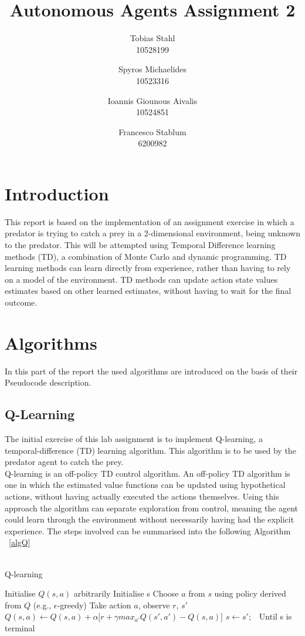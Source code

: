 \documentclass[11pt]{article}
\title{
	\textbf{Autonomous Agents Assignment 2}
}
\author{Tobias Stahl \\ 10528199 \and Spyros Michaelides \\ 10523316 \and Ioannis Giounous Aivalis \\ 10524851 \and Francesco Stablum \\ 6200982}
\begin{document}
\maketitle


\section{Introduction}
This report is based on the implementation of an assignment exercise in which a predator is trying to catch a prey in a 2-dimensional environment, being unknown to the predator. This will be attempted  using Temporal Difference learning methods (TD), a combination of Monte Carlo and dynamic programming. TD learning methods can learn directly from experience, rather than having to rely on a model of the environment. TD methods can update action state values estimates based on other learned estimates, without having to wait for the final outcome. 

\section{Algorithms}
In this part of the report the used algorithms are introduced on the basis of their Pseudocode description.


\subsection{Q-Learning}
The initial exercise of this lab assignment is to implement Q-learning, a temporal-difference (TD) learning algorithm. This algorithm is to be used by the predator agent to catch the prey.\\
Q-learning is an off-policy TD control algorithm. An off-policy TD algorithm is one in which the estimated value functions can be updated using hypothetical actions, without having actually executed the actions themselves. Using this approach the algorithm can separate exploration from control, meaning the agent could learn through the environment without necessarily having had the explicit experience.
The steps involved can be summarised into the following Algorithm ~\ref{algQ}\\\\



\begin{algorithm}
\caption{Q-learning}
\begin{algorithmic}
\label{algQ}
\STATE Initialise $Q(s,a)$ arbitrarily
\STATE Initialise s
\STATE Choose $a$ from $s$ using policy derived from $Q$ (e.g., $\epsilon$-greedy)
\STATE Take action $a$, observe $r$, $s'$
\STATE $Q(s,a) \leftarrow Q(s,a) + \alpha \lbrack r + \gamma max_{a'} Q(s',a') - Q(s,a)\rbrack$
\STATE $s \leftarrow s';$\
\ENDFOR
\STATE Until s is terminal
\ENDFOR
\end{algorithmic}
\end{algorithm}
\end{document}
